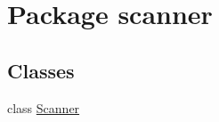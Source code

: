 \hypertarget{namespacescanner}{}\section{Package scanner}
\label{namespacescanner}
\subsection*{Classes}
\begin{DoxyCompactItemize}
\item 
class \hyperlink{classscanner_1_1Scanner}{Scanner}
\end{DoxyCompactItemize}
